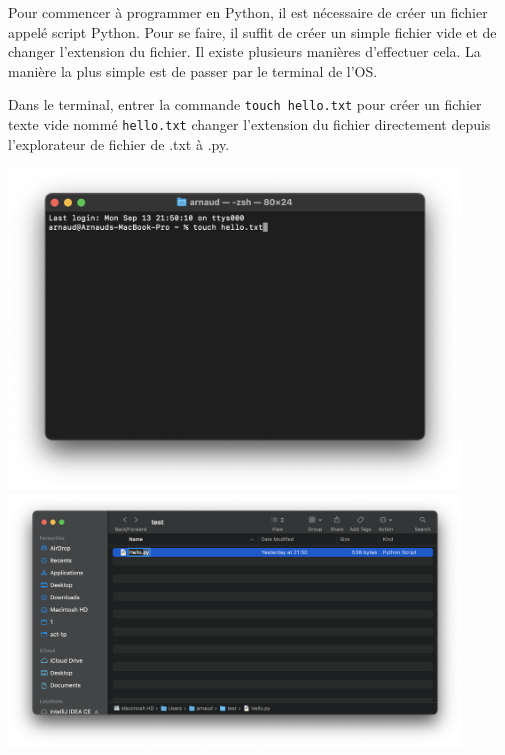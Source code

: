 Pour commencer à programmer en Python, il est nécessaire de créer un fichier appelé script Python. Pour se faire, il suffit de créer un simple fichier vide et de changer l'extension du fichier. Il existe plusieurs manières d'effectuer cela. La manière la plus simple est de passer par le terminal de l'OS.
\\
\begin{Exercice}[5 minutes]

Dans le terminal, entrer la commande \lstinline{touch hello.txt} pour créer un fichier texte vide nommé \lstinline{hello.txt} changer l'extension du fichier directement depuis l'explorateur de fichier de .txt à .py.
\begin{solution}
\begin{center}
	\includegraphics[width=12cm]{terminal.png}
	\includegraphics[width=12cm]{py.png}
	
\end{center}
\end{solution}

\end{Exercice}


